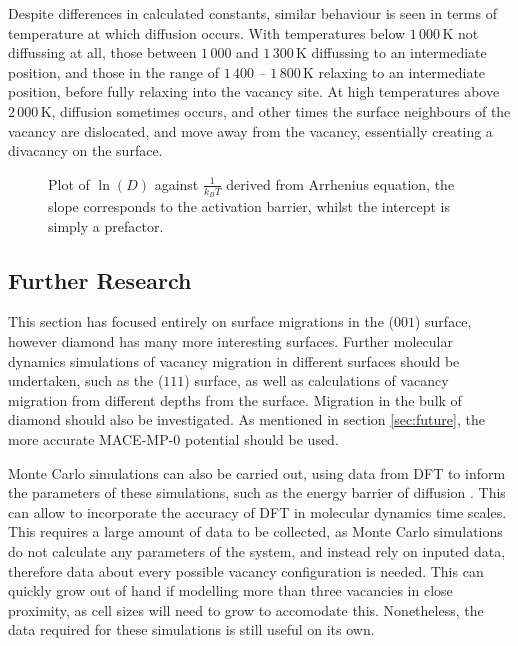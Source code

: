 \documentclass[10pt,a4paper,twocolumn,twoside]{extarticle}
\begin{document}
Despite differences in calculated constants, similar behaviour is seen in terms of temperature at which diffusion occurs. With temperatures below $1\,000$\,K not diffussing at all, those between $1\,000$ and $1\,300$\,K diffussing to an intermediate position, and those in the range of $1\,400$ -- $1\,800$\,K relaxing to an intermediate position, before fully relaxing into the vacancy site. At high temperatures above $2\,000$\,K, diffusion sometimes occurs, and other times the surface neighbours of the vacancy are dislocated, and move away from the vacancy, essentially creating a divacancy on the surface. 


\begin{figure}
		\resizebox{\columnwidth}{!}{%
		
		}
		\caption{Plot of $\ln(D)$ against $\frac{1}{k_BT}$ derived from  Arrhenius equation, the slope corresponds  to the activation barrier, whilst the intercept is simply a prefactor.}
		\label{fig:arr}
\end{figure}


\subsection{Further Research}
This section has focused entirely on surface migrations in the ($001$) surface, however diamond has many more interesting surfaces. Further molecular dynamics simulations of vacancy migration in different surfaces should be undertaken, such as the ($111$) surface, as well as calculations of vacancy migration from different depths from the surface. Migration in the bulk of diamond should also be investigated.
As mentioned in section \ref{sec:future}, the more accurate MACE-MP-0 potential \cite{MACE} should be used. 

Monte Carlo simulations can also be carried out, using data from DFT to inform the parameters of these simulations, such as the energy barrier of diffusion \cite{radiation_modelling, HybridMonteCarlo}. This can allow to incorporate the accuracy of DFT in molecular dynamics time scales. This requires a large amount of data to be collected, as Monte Carlo simulations do not calculate any parameters of the system, and instead rely on inputed data, therefore data about every possible vacancy configuration is needed. This can quickly grow out of hand if modelling more than three vacancies in close proximity, as cell sizes will need to grow to accomodate this. Nonetheless, the data required for these simulations is still useful on its own.
\end{document}

